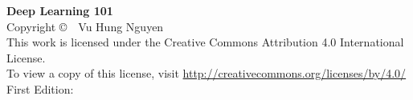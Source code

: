 \documentclass[10pt,\papersize,twoside,openright]{book}
\theoremstyle{definition}
\theoremstyle{remark}
\begin{document}
\newpage
\thispagestyle{empty}
\vspace*{\fill}
\begin{flushleft}
\textbf{Deep Learning 101}\\
Copyright \copyright~\the\year~Vu Hung Nguyen\\[0.5em]
This work is licensed under the Creative Commons Attribution 4.0 International License.\\
To view a copy of this license, visit \url{http://creativecommons.org/licenses/by/4.0/}\\[0.5em]
First Edition: \DTMtoday
\end{flushleft}
\vspace*{\fill}
\clearpage

\newpage
\thispagestyle{empty}
\vspace*{\fill}
\end{document}
